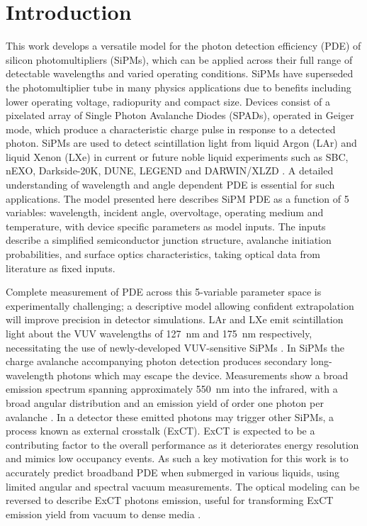 \section{Introduction}
\label{sec:introduction}
\noindent This work develops a versatile model for the photon detection efficiency (PDE) of silicon photomultipliers (SiPMs), which can be applied across their full range of detectable wavelengths and varied operating conditions. SiPMs have superseded the photomultiplier tube in many physics applications due to benefits including lower operating voltage, radiopurity and compact size. Devices consist of a pixelated array of Single Photon Avalanche Diodes (SPADs), operated in Geiger mode, which produce a characteristic charge pulse in response to a detected photon. SiPMs are used to detect scintillation light from liquid Argon (LAr) and liquid Xenon (LXe) in current or future noble liquid experiments such as SBC, nEXO, Darkside-20K, DUNE, LEGEND and DARWIN/XLZD \cite{sbc_snowmass2021, adhikari_nexo_2021, carnesecchi_darkSide_light_2020, DUNE_updated, legend_result, baudis_darwinxlzd_2024}. A detailed understanding of wavelength and angle dependent PDE is essential for such applications. The model presented here describes SiPM PDE as a function of 5 variables: wavelength, incident angle, overvoltage, operating medium and temperature, with device specific parameters as model inputs. The inputs describe a simplified semiconductor junction structure, avalanche initiation probabilities, and surface optics characteristics, taking optical data from literature as fixed inputs. 

Complete measurement of PDE across this 5-variable parameter space is experimentally challenging; a descriptive model allowing confident extrapolation will improve precision in detector simulations. LAr and LXe emit scintillation light about the VUV wavelengths of 127~nm \cite{fuji_lxe_2015} and 175~nm \cite{Heindl_LAr_2010} respectively, necessitating the use of newly-developed VUV-sensitive SiPMs \cite{baudis_characterisation_2018, gallina_characterization_2019-1, gallina_performance_2022}. In SiPMs the charge avalanche accompanying photon detection produces secondary long-wavelength photons which may escape the device. Measurements show a broad emission spectrum spanning approximately 550~nm into the infrared, with a broad angular distribution\cite{lolx_ext_2025} and an emission yield of order one photon per avalanche \cite{raymond_stimulated_TED_2024}. In a detector these emitted photons may trigger other SiPMs, a process known as external crosstalk (ExCT)\cite{lolx_ext_2025, hampel_optical_2020, joe_emission_2021}. ExCT is expected to be a contributing factor to the overall performance as it deteriorates energy resolution and mimics low occupancy events\cite{Gibbons_2024_flashlight}. As such a key motivation for this work is to accurately predict broadband PDE when submerged in various liquids, using limited angular and spectral vacuum measurements. The optical modeling can be reversed to describe ExCT photons emission, useful for transforming ExCT emission yield from vacuum to dense media \cite{lolx_ext_2025}.

